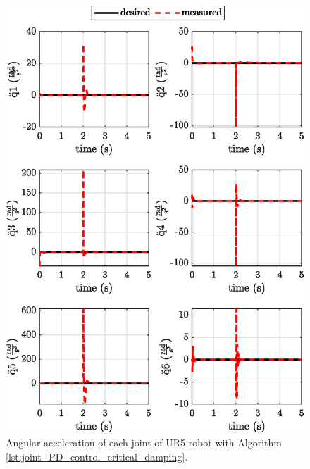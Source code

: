 \begin{figure}[H]
    \centering
    \includegraphics{images/act_1.5/joint_acceleration.eps}
    \caption{Angular acceleration of each joint of UR5 robot with Algorithm \ref{lst:joint_PD_control_critical_damping}.}
    \label{fig:act_1.5_joint_acceleration}
\end{figure}

